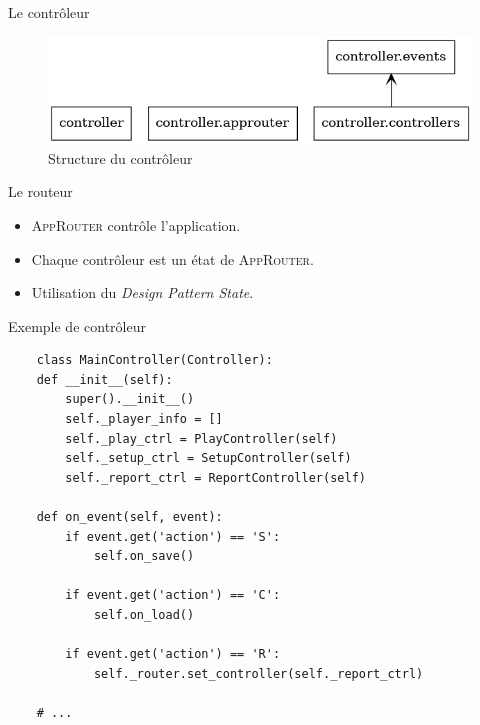 \begin{frame}{Le contrôleur}
  \begin{center}
    \begin{figure}
      \includegraphics[scale=0.3]{img/controller.png}
      \caption{Structure du contrôleur}
    \end{figure}
  \end{center}

  \begin{block}{Le routeur}
    \begin{itemize}
    \item \textsc{AppRouter} contrôle l'application.
    \item Chaque contrôleur est un état de \textsc{AppRouter}.
    \item Utilisation du \textit{Design Pattern State}.
    \end{itemize}
    
  \end{block}
\end{frame}

\begin{frame}[fragile]{Exemple de contrôleur}
  \footnotesize
  \begin{verbatim}
    class MainController(Controller):
    def __init__(self):
        super().__init__()
        self._player_info = []
        self._play_ctrl = PlayController(self)
        self._setup_ctrl = SetupController(self)
        self._report_ctrl = ReportController(self)

    def on_event(self, event):
        if event.get('action') == 'S':
            self.on_save()

        if event.get('action') == 'C':
            self.on_load()

        if event.get('action') == 'R':
            self._router.set_controller(self._report_ctrl)

    # ...
  \end{verbatim}
\end{frame}

